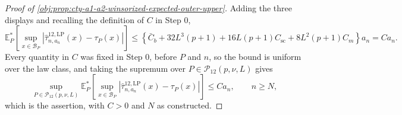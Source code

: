 \documentclass[11pt]{article}
\begin{document}
\begin{proof}[Proof of \cref{obj:prop:cty-a1-a2-winsorized-expected-outer-upper}]
Adding the three displays and recalling the definition of \(C\) in Step 0,
\[
\mathbb E_P^*\!\left[\sup_{x\in\mathcal B_P}\left|\widehat\tau^{12,\mathrm{LP}}_{n,a_n}(x)-\tau_P(x)\right|\right]
\leq
\left\{\bar C_b+32L^3(p+1)+16L(p+1)C_{\mathrm{sc}}+8L^2(p+1)C_m\right\}a_n
=
Ca_n .
\]
Every quantity in \(C\) was fixed in Step 0, before \(P\) and \(n\), so the bound is uniform over the law class, and taking the supremum over \(P\in\mathcal P_{12}(p,\nu,L)\) gives
\[
\sup_{P\in\mathcal P_{12}(p,\nu,L)}
\mathbb E_P^*\!\left[
\sup_{x\in\mathcal B_P}
\left|\widehat\tau^{12,\mathrm{LP}}_{n,a_n}(x)-\tau_P(x)\right|
\right]
\leq
Ca_n,
\qquad n\geq N ,
\]
which is the assertion, with \(C>0\) and \(N\) as constructed.
\end{proof}
\end{document}
